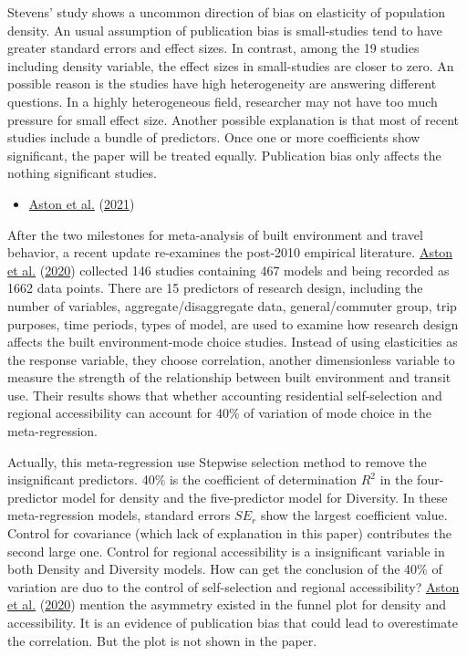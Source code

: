 \documentclass[
  11pt,
  openany]{memoir}
\providecommand{\tightlist}{%
  \setlength{\itemsep}{0pt}\setlength{\parskip}{0pt}}
\begin{document}
Stevens' study shows a uncommon direction of bias on elasticity of population density. An usual assumption of publication bias is small-studies tend to have greater standard errors and effect sizes. In contrast, among the 19 studies including density variable, the effect sizes in small-studies are closer to zero. An possible reason is the studies have high heterogeneity are answering different questions. In a highly heterogeneous field, researcher may not have too much pressure for small effect size. Another possible explanation is that most of recent studies include a bundle of predictors. Once one or more coefficients show significant, the paper will be treated equally. Publication bias only affects the nothing significant studies.

\begin{itemize}
\tightlist
\item
  \protect\hyperlink{ref-astonExploringBuiltEnvironment2021}{Aston et al.} (\protect\hyperlink{ref-astonExploringBuiltEnvironment2021}{2021})
\end{itemize}

After the two milestones for meta-analysis of built environment and travel behavior, a recent update re-examines the post-2010 empirical literature. \protect\hyperlink{ref-astonStudyDesignImpacts2020}{Aston et al.} (\protect\hyperlink{ref-astonStudyDesignImpacts2020}{2020}) collected 146 studies containing 467 models and being recorded as 1662 data points. There are 15 predictors of research design, including the number of variables, aggregate/disaggregate data, general/commuter group, trip purposes, time periods, types of model, are used to examine how research design affects the built environment-mode choice studies. Instead of using elasticities as the response variable, they choose correlation, another dimensionless variable to measure the strength of the relationship between built environment and transit use. Their results shows that whether accounting residential self-selection and regional accessibility can account for 40\% of variation of mode choice in the meta-regression.

Actually, this meta-regression use Stepwise selection method to remove the insignificant predictors. 40\% is the coefficient of determination \(R^2\) in the four-predictor model for density and the five-predictor model for Diversity. In these meta-regression models, standard errors \(SE_r\) show the largest coefficient value. Control for covariance (which lack of explanation in this paper) contributes the second large one. Control for regional accessibility is a insignificant variable in both Density and Diversity models. How can get the conclusion of the 40\% of variation are duo to the control of self-selection and regional accessibility? \protect\hyperlink{ref-astonStudyDesignImpacts2020}{Aston et al.} (\protect\hyperlink{ref-astonStudyDesignImpacts2020}{2020}) mention the asymmetry existed in the funnel plot for density and accessibility. It is an evidence of publication bias that could lead to overestimate the correlation. But the plot is not shown in the paper.
\end{document}
